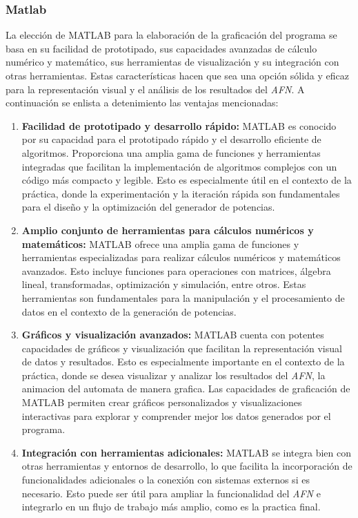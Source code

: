 \documentclass{article}
\begin{document}
        \subsubsection{Matlab}
        La elección de MATLAB para la elaboración de la graficación del programa se basa en su facilidad de prototipado, sus capacidades
        avanzadas de cálculo numérico y matemático, sus herramientas de visualización y su integración con otras herramientas. Estas
        características hacen que sea una opción sólida y eficaz para la representación visual y el análisis de los resultados del
        \textit{AFN}. A continuación se enlista a detenimiento las ventajas mencionadas:

        \begin{enumerate}
            \item \textbf{Facilidad de prototipado y desarrollo rápido:} MATLAB es conocido por su capacidad para el prototipado rápido y
            el desarrollo eficiente de algoritmos. Proporciona una amplia gama de funciones y herramientas integradas que facilitan la
            implementación de algoritmos complejos con un código más compacto y legible. Esto es especialmente útil en el contexto de la
            práctica, donde la experimentación y la iteración rápida son fundamentales para el diseño y la optimización del generador de
            potencias.

            \item \textbf{Amplio conjunto de herramientas para cálculos numéricos y matemáticos:} MATLAB ofrece una amplia gama de
            funciones y herramientas especializadas para realizar cálculos numéricos y matemáticos avanzados. Esto incluye funciones para
            operaciones con matrices, álgebra lineal, transformadas, optimización y simulación, entre otros. Estas herramientas son
            fundamentales para la manipulación y el procesamiento de datos en el contexto de la generación de potencias.

            \item \textbf{Gráficos y visualización avanzados:} MATLAB cuenta con potentes capacidades de gráficos y visualización que
            facilitan la representación visual de datos y resultados. Esto es especialmente importante en el contexto de la práctica,
            donde se desea visualizar y analizar los resultados del \textit{AFN}, la animacion del automata de manera grafica.
            Las capacidades de graficación de MATLAB permiten crear gráficos personalizados y visualizaciones interactivas para
            explorar y comprender mejor los datos generados por el programa.

            \item \textbf{Integración con herramientas adicionales:} MATLAB se integra bien con otras herramientas y entornos de desarrollo,
            lo que facilita la incorporación de funcionalidades adicionales o la conexión con sistemas externos si es necesario. Esto
            puede ser útil para ampliar la funcionalidad del \textit{AFN} e integrarlo en un flujo de trabajo más amplio, como es la
            practica final.
        \end{enumerate}
\end{document}
